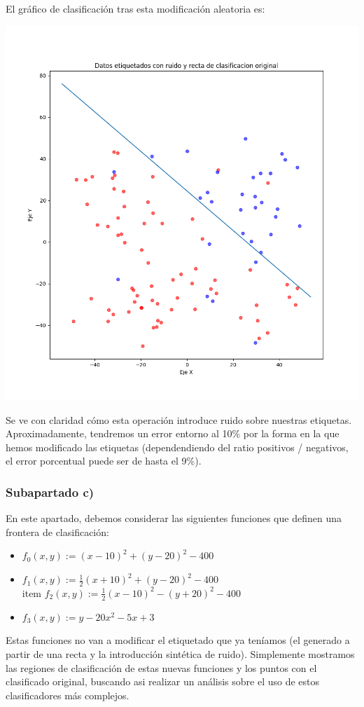 \documentclass[11pt]{article}
\begin{document}
El gráfico de clasificación tras esta modificación aleatoria es:

\includegraphics[width = 0.8 \textwidth]{puntos_clasificados_recta_aleatorizados01}

Se ve con claridad cómo esta operación introduce ruido sobre nuestras etiquetas. Aproximadamente, tendremos un error entorno al 10\% por la forma en la que hemos modificado las etiquetas (dependendiendo del ratio positivos / negativos, el error porcentual puede ser de hasta el 9\%).

\subsubsection{Subapartado c)} \label{section:apartado_obligatorio}

En este apartado, debemos considerar las siguientes funciones que definen una frontera de clasificación:

\begin{itemize}
    \item $f_0(x, y):= (x - 10)^2 + (y - 20)^2 - 400$
    \item $f_1(x, y):= \frac{1}{2} (x + 10)^2 + (y - 20)^2 - 400$
    \\item $f_2(x, y):= \frac{1}{2} (x - 10)^2 - (y + 20)^2 - 400$
    \item $f_3(x, y):= y - 20x^2 -5x +3$
\end{itemize}

Estas funciones no van a modificar el etiquetado que ya teníamos (el generado a partir de una recta y la introducción sintética de ruido). Simplemente mostramos las regiones de clasificación de estas nuevas funciones y los puntos con el clasificado original, buscando asi realizar un análisis sobre el uso de estos clasificadores más complejos.
\end{document}
